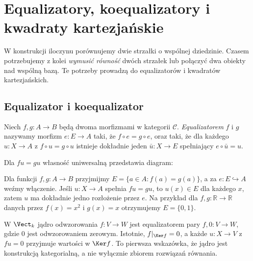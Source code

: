 \section{Equalizatory, koequalizatory i kwadraty kartezjańskie}\label{sec:equalizatory}

\providecommand{\atlasref}[2]{#2}

W konstrukcji iloczynu porównujemy dwie strzałki o wspólnej dziedzinie. Czasem potrzebujemy z kolei \emph{wymusić równość} dwóch strzałek lub połączyć dwa obiekty nad wspólną bazą. Te potrzeby prowadzą do equalizatorów i kwadratów kartezjańskich.

\subsection{Equalizator i koequalizator}

\begin{definicja}[Equalizator]\label{def:equalizer}
Niech $f,g:A\to B$ będą dwoma morfizmami w kategorii $\mathcal C$. \emph{Equalizatorem} $f$ i $g$ nazywamy morfizm $e:E\to A$ taki, że $f\circ e=g\circ e$, oraz taki, że dla każdego $u:X\to A$ z $f\circ u=g\circ u$ istnieje dokładnie jeden $\bar u:X\to E$ spełniający $e\circ\bar u=u$.
\end{definicja}
Dla $fu=gu$ własność uniwersalną przedstawia diagram:
\begin{center}
\end{center}

\begin{przyklad}
Dla funkcji $f,g:A\to B$ przyjmijmy $E=\{a\in A:f(a)=g(a)\}$, a za $e:E\hookrightarrow A$ weźmy włączenie. Jeśli $u:X\to A$ spełnia $fu=gu$, to $u(x)\in E$ dla każdego $x$, zatem $u$ ma dokładnie jedno rozłożenie przez $e$. Na przykład dla $f,g:\mathbb R\to\mathbb R$ danych przez $f(x)=x^2$ i $g(x)=x$ otrzymujemy $E=\{0,1\}$.
\end{przyklad}

\begin{przyklad}
W $\Vect_k$ jądro odwzorowania $f:V\to W$ jest equalizatorem pary $f,0:V\to W$, gdzie $0$ jest odwzorowaniem zerowym. Istotnie, $f|_{\Ker f}=0$, a każde $u:X\to V$ z $fu=0$ przyjmuje wartości w $\Ker f$. To pierwsza wskazówka, że jądro jest konstrukcją kategorialną, a nie wyłącznie zbiorem rozwiązań równania.
\end{przyklad}

